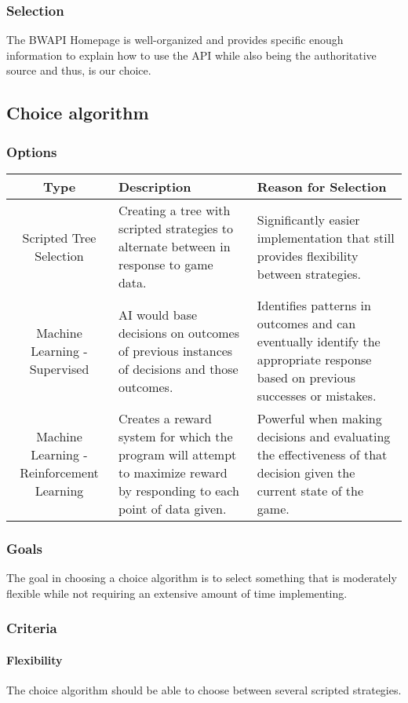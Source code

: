 \documentclass[10pt,letterpaper,onecolumn,draftclsnofoot]{IEEEtran}
\begin{document}
\subsubsection{Selection}
The BWAPI Homepage is well-organized and provides specific enough information to explain how to use the API while also being the authoritative source and thus, is our choice.

\subsection{Choice algorithm}
\subsubsection{Options}
\begin{center}
	\begin{tabular}{ ||C|L|L|| } 
		\hline
		Type & Description & Reason for Selection \\
		\hline
		Scripted Tree Selection & Creating a tree with scripted strategies to alternate between in response to game data. & Significantly easier implementation that still provides flexibility between strategies. \\ 
		\hline
		Machine Learning - Supervised & AI would base decisions on outcomes of previous instances of decisions and those outcomes. & Identifies patterns in outcomes and can eventually identify the appropriate response based on previous successes or mistakes. \\ 
		\hline
		Machine Learning - Reinforcement Learning & Creates a reward system for which the program will attempt to maximize reward by responding to each point of data given. & Powerful when making decisions and evaluating the effectiveness of that decision given the current state of the game. \\ 
		\hline
	\end{tabular}
\end{center}
\subsubsection{Goals}
The goal in choosing a choice algorithm is to select something that is moderately flexible while not requiring an extensive amount of time implementing.
\subsubsection{Criteria}
\paragraph{Flexibility}
The choice algorithm should be able to choose between several scripted strategies.
\end{document}
